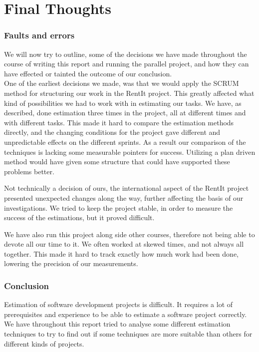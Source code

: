 \part{Final Thoughts}
\section{Faults and errors}
We will now try to outline, some of the decisions we have made throughout the course of writing this report and running the parallel project, and how they can have effected or tainted the outcome of our conclusion.\\

One of the earliest decisions we made, was that we would apply the SCRUM method for structuring our work in the RentIt project. This greatly affected what kind of possibilities we had to work with in estimating our tasks. We have, as described, done estimation three times in the project, all at different times and with different tasks. This made it hard to compare the estimation methods directly, and the changing conditions for the project gave different and unpredictable effects on the different sprints. As a result our comparison of the techniques is lacking some measurable pointers for success. Utilizing a plan driven method would have given some structure that could have supported these problems better.

Not technically a decision of ours, the international aspect of the RentIt project presented unexpected changes along the way, further affecting the basis of our investigations. We tried to keep the project stable, in order to measure the success of the estimations, but it proved difficult.

We have also run this project along side other courses, therefore not being able to devote all our time to it. We often worked at skewed times, and not always all together. This made it hard to track exactly how much work had been done, lowering the precision of our measurements.

\section{Conclusion}
Estimation of software development projects is difficult. It requires a lot of prerequisites and experience to
be able to estimate a software project correctly. We have throughout this report tried to analyse some different
estimation techniques to try to find out if some techniques are more suitable than others for different kinds of
projects.\\

